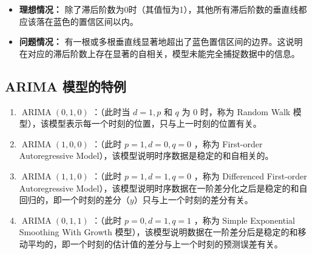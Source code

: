 \begin{itemize}
    \item \textbf{理想情况：} 除了滞后阶数为0时（其值恒为1），其他所有滞后阶数的垂直线都应该落在蓝色的置信区间以内。
    \item \textbf{问题情况：} 有一根或多根垂直线显著地超出了蓝色置信区间的边界。这说明在对应的滞后阶数上存在显著的自相关，模型未能完全捕捉数据中的信息。
\end{itemize}

\subsection{ARIMA 模型的特例}

\begin{definition}[特例]
    \begin{enumerate}
        \item $\operatorname{ARIMA}(0,1,0)$ ：（此时当 $d=1, p$ 和 $q$ 为 0 时，称为 Random Walk 模型），该模型表示每一个时刻的位置，只与上一时刻的位置有关。
        \item $\operatorname{ARIMA}(1,0,0)$ ：（此时 $p=1, d=0, q=0$ ，称为 First-order Autoregressive Model），该模型说明时序数据是稳定的和自相关的。
        \item $\operatorname{ARIMA}(1,1,0)$ ：（此时 $p=1, d=1, q=0$ ，称为 Differenced First-order Autoregressive Model），该模型说明时序数据在一阶差分化之后是稳定的和自回归的，即一个时刻的差分（$y$）只与上一个时刻的差分有关。
        \item $\operatorname{ARIMA}(0,1,1)$ ：（此时 $p=0, d=1, q=1$ ，称为 Simple Exponential Smoothing With Growth 模型），该模型说明数据在一阶差分后是稳定的和移动平均的，即一个时刻的估计值的差分与上一个时刻的预测误差有关。
    \end{enumerate}
\end{definition}

